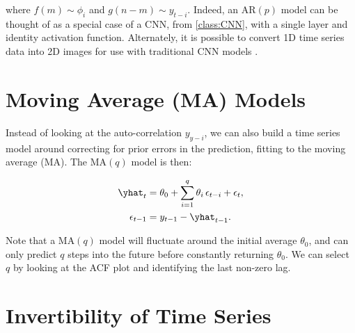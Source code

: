 
\noindent where $f\left(m\right) \sim \phi_{i}$ and
$g\left(n-m\right) \sim y_{t-i}$.
Indeed, an $\text{AR}\left(p\right)$ model can be thought of as
a special case of a CNN, from \cref{class:CNN},
with a single layer and identity activation function.
Alternately, it is possible to convert 1D time series data into 2D images
for use with traditional CNN models \cite{wang_encoding_ts}.

\section{Moving Average (MA) Models}
\label{time_series:MA}

Instead of looking at the auto-correlation $y_{y-i}$,
we can also build a time series model around
correcting for prior errors in the prediction,
\ie fitting to the moving average (MA).
The $\text{MA}\left(q\right)$ model
is then:

\begin{subequations}\label{eq:time_series:MA}
\begin{align}
\yhat_{t} &= \theta_{0} + \sum_{i=1}^{q} \theta_{i}\, \epsilon_{t-i} + \epsilon_{t}, \label{eq:time_series:MA_y} \\
\epsilon_{t-1} &= y_{t-1} - \yhat_{t-1}. \label{eq:time_series:MA_epsilon}
\end{align}
\end{subequations}

Note that a $\text{MA}\left(q\right)$ model will fluctuate around the initial average $\theta_{0}$,
and can only predict $q$ steps into the future before constantly returning $\theta_{0}$.
We can select $q$ by looking at the ACF plot
and identifying the last non-zero lag.

\section{Invertibility of Time Series}
\label{time_series:invert}

